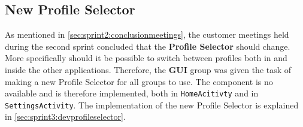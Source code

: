 \subsection{New Profile Selector}

As mentioned in \cref{sec:sprint2:conclusionmeetings}, the customer meetings held during the second sprint concluded that the \textbf{Profile Selector} should change.
More specifically should it be possible to switch between profiles both in \launcher and inside the other \giraf applications.
Therefore, the \textbf{GUI} group was given the task of making a new Profile Selector for all groups to use.
The component is no available and is therefore implemented, both in \lstinline!HomeAcitivty! and in \lstinline!SettingsActivity!. 
The implementation of the new Profile Selector is explained in \cref{sec:sprint3:devprofileselector}.